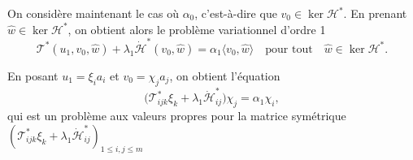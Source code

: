 \documentclass[12pt, final]{amsart}
\begin{document}
On considère maintenant le cas où \(\alpha_0\), c'est-à-dire que
\(v_0\in\ker\mathcal H^\ast\). En prenant \(\hat{w}\in\ker\mathcal H^\ast\), on
obtient alors le problème variationnel d'ordre 1
\begin{equation}
  \mathcal T^\ast(u_1, v_0, \hat{w})
  +\lambda_1\dot{\mathcal H}^\ast(v_0, \hat{w})
  =\alpha_1\langle v_0, \hat{w}\rangle
  \quad\text{pour tout}\quad
  \hat{w}\in\ker\mathcal H^\ast.
\end{equation}

En posant \(u_1=\xi_ia_i\) et \(v_0=\chi_j a_j\), on obtient l'équation
\begin{equation}
  \bigl(\mathcal T_{ijk}^\ast\xi_k+\lambda_1\dot{\mathcal H}_{ij}^\ast\bigr)\chi_j
  =\alpha_1\chi_i,
\end{equation}
qui est un problème aux valeurs propres pour la matrice symétrique
\((\mathcal T_{ijk}^\ast\xi_k+\lambda_1\dot{\mathcal H}_{ij}^\ast)_{1\leq i,
  j\leq m}\)


\end{document}

